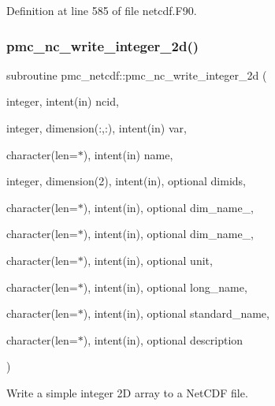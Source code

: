 Definition at line 585 of file netcdf.\+F90.

\mbox{\label{namespacepmc__netcdf_a948590db9b9b4f73c2da2cc1ed2af6aa}} 
\subsubsection{\texorpdfstring{pmc\+\_\+nc\+\_\+write\+\_\+integer\+\_\+2d()}{pmc\_nc\_write\_integer\_2d()}}
{\footnotesize\ttfamily subroutine pmc\+\_\+netcdf\+::pmc\+\_\+nc\+\_\+write\+\_\+integer\+\_\+2d (\begin{DoxyParamCaption}\item[{integer, intent(in)}]{ncid,  }\item[{integer, dimension(\+:,\+:), intent(in)}]{var,  }\item[{character(len=$\ast$), intent(in)}]{name,  }\item[{integer, dimension(2), intent(in), optional}]{dimids,  }\item[{character(len=$\ast$), intent(in), optional}]{dim\+\_\+name\+\_,  }\item[{character(len=$\ast$), intent(in), optional}]{dim\+\_\+name\+\_,  }\item[{character(len=$\ast$), intent(in), optional}]{unit,  }\item[{character(len=$\ast$), intent(in), optional}]{long\+\_\+name,  }\item[{character(len=$\ast$), intent(in), optional}]{standard\+\_\+name,  }\item[{character(len=$\ast$), intent(in), optional}]{description }\end{DoxyParamCaption})}



Write a simple integer 2D array to a Net\+C\+DF file. 


